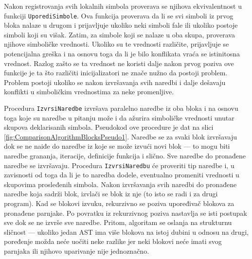 Nakon registrovanja svih lokalnih simbola proverava se njihova ekvivalentnost u funkciji \texttt{UporediSimbole}. Ova funkcija proverava da li se svi simboli iz prvog bloka nalaze u drugom i prijavljuje ukoliko neki simboli fale ili ukoliko postoje simboli koji su višak. Zatim, za simbole koji se nalaze u oba skupa, proverava njihove simboličke vrednosti. Ukoliko su te vrednosti različite, prijavljuje se potencijalna greška i na osnovu toga da li je bilo konflikata vraća se istinitosna vrednost. Razlog zašto se ta vrednost ne koristi dalje nakon prvog poziva ove funkcije je ta što različiti inicijalizatori ne znače nužno da postoji problem. Problem postoji ukoliko se nakon izvršavanja svih naredbi i dalje dešavaju konflikti u simboličkim vrednostima za neke promenljive. 

Procedura \texttt{IzvrsiNaredbe} izvršava paralelno naredbe iz oba bloka i na osnovu toga koje su naredbe u pitanju može i da ažurira simboličke vrednosti unutar skupova deklarisanih simbola. Pseudokod ove procedure je dat na slici \ref{fig:ComparisonAlgorithmBlocksPseudo1}. Naredbe se za svaki blok izvršavaju dok se ne naiđe do naredbe iz koje se može izvući novi blok --- to mogu biti naredbe grananja, iteracije, definicije funkcija i slično. Sve naredbe do pronađene naredbe se izvršavaju. Procedura \texttt{IzvrsiNaredbu} će proveriti tip naredbe i, u zavisnosti od toga da li je to naredba dodele, eventualno promeniti vrednosti u skupovima prosleđenih simbola. Nakon izvršavanja svih naredbi do pronađene naredbe koja sadrži blok, izvlači se blok iz nje (to isto se radi i za drugi program). Kad se blokovi izvuku, rekurzivno se poziva upoređivač blokova za pronađene parnjake. Po povratku iz rekurzivnog poziva nastavlja se isti postupak sve dok se ne izvrše sve naredbe. Pritom, algoritam se oslanja na strukturnu sličnost --- ukoliko jedan AST ima više blokova na istoj dubini u odnosu na drugi, poređenje možda neće uočiti neke razlike jer neki blokovi neće imati svog parnjaka ili njihovo uparivanje nije jednoznačno.

